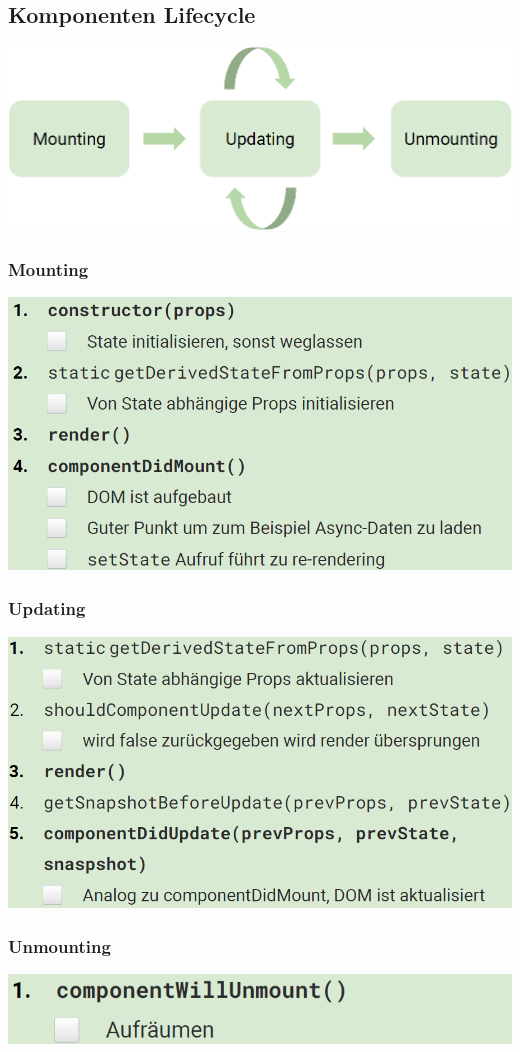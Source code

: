 \subsection{Komponenten Lifecycle}
\includegraphics[width=0.7\linewidth]{img/react_lifecycle.png}
\subsubsection{Mounting}
\includegraphics[width=0.7\linewidth]{img/react_mounting.png}

\subsubsection{Updating}
\includegraphics[width=0.7\linewidth]{img/react_updating.png}

\subsubsection{Unmounting}
\includegraphics[width=0.6\linewidth]{img/react_unmounting.png}

